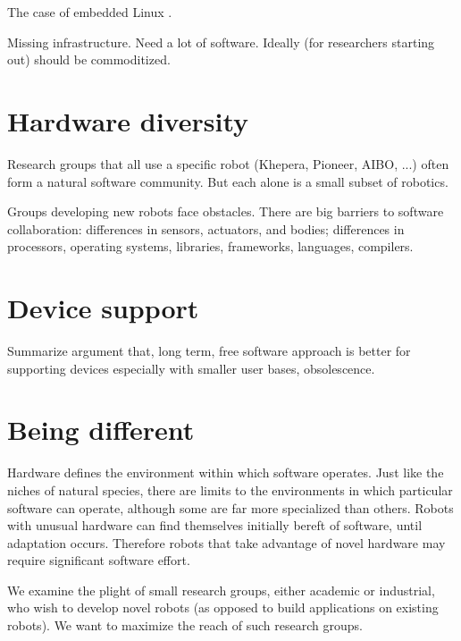 \cite{gerkey03player}

\cite{natale05developmental}

\cite{nesnas2006claraty}

\cite{vaughan2006really}

\cite{vonkrogh2006promise}


The case of embedded Linux \cite{henkel2006selective}.

Missing infrastructure.
Need a lot of software.
Ideally (for researchers starting out) should be commoditized.

\section{Hardware diversity}

Research groups that all use a specific robot (Khepera, Pioneer, AIBO,
...) often form a natural software community.  But each alone is 
a small subset of robotics.

Groups developing new robots face obstacles.  There are big barriers
to software collaboration: differences in sensors, actuators, and
bodies; differences in processors, operating systems, libraries,
frameworks, languages, compilers.


\section{Device support}

Summarize argument that, long term, free software approach 
is better for supporting devices especially with smaller user
bases, obsolescence.

\section{Being different}


Hardware defines the environment within which software operates.  Just
like the niches of natural species, there are limits to the
environments in which particular software can operate, although some
are far more specialized than others.  Robots with unusual 
hardware can find themselves initially bereft of software,
until adaptation occurs.  Therefore robots that take advantage
of novel hardware may require significant software effort.

We examine the plight of small research groups, either academic or
industrial, who wish to develop novel robots (as opposed to 
build applications on existing robots).  We want to maximize the 
reach of such research groups.

